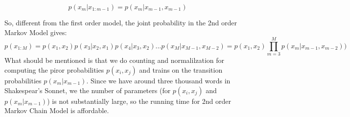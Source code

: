 \begin{equation}
  p(x_m|x_{1:m-1}) = p(x_m|x_{m-1}, x_{m-1})
\end{equation}

So, different from the first order model, the joint probability in the 2nd order Markov Model gives:
\begin{equation}
  p(x_{1:M}) =p(x_1, x_2)p(x_3|x_2, x_1)p(x_4|x_3, x_2) ...  p(x_M|x_{M-1}, x_{M-2}) = p(x_1, x_2) \prod\limits_{m=3}^M p(x_m|x_{m-1}, x_{m-2}))
\end{equation} 
What should be mentioned is that we do counting and normalilzation for computing the piror probabilities $p(x_i, x_j)$ and trains on the transition probabilities $p(x_m|x_{m-1})$. Since we have around three thousand words in Shakespear's Sonnet, we the number of parameters (for $p(x_i, x_j)$ and $p(x_m|x_{m-1})$) is not substantially large, so the running time for 2nd order Markov Chain Model is affordable.

